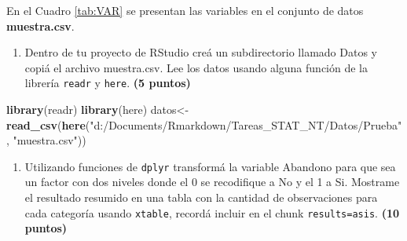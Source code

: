 \documentclass[
]{article}
\newenvironment{Shaded}{\begin{snugshade}}{\end{snugshade}}
\newcommand{\DataTypeTok}[1]{\textcolor[rgb]{0.13,0.29,0.53}{#1}}
\newcommand{\KeywordTok}[1]{\textcolor[rgb]{0.13,0.29,0.53}{\textbf{#1}}}
\newcommand{\NormalTok}[1]{#1}
\newcommand{\OperatorTok}[1]{\textcolor[rgb]{0.81,0.36,0.00}{\textbf{#1}}}
\newcommand{\StringTok}[1]{\textcolor[rgb]{0.31,0.60,0.02}{#1}}
\providecommand{\tightlist}{%
  \setlength{\itemsep}{0pt}\setlength{\parskip}{0pt}}
\begin{document}
En el Cuadro \ref{tab:VAR} se presentan las variables en el conjunto de
datos \textbf{muestra.csv}.

\newpage

\begin{enumerate}
\def\labelenumi{\arabic{enumi}.}
\tightlist
\item
  Dentro de tu proyecto de RStudio creá un subdirectorio llamado Datos y
  copiá el archivo muestra.csv. Lee los datos usando alguna función de
  la librería \texttt{readr} y \texttt{here}. \textbf{(5 puntos)}
\end{enumerate}

\begin{Shaded}
\begin{Highlighting}[]
\KeywordTok{library}\NormalTok{(readr)}
\KeywordTok{library}\NormalTok{(here)}
\NormalTok{datos<-}\KeywordTok{read_csv}\NormalTok{(}\KeywordTok{here}\NormalTok{(}\StringTok{"d:/Documents/Rmarkdown/Tareas_STAT_NT/Datos/Prueba"}\NormalTok{, }\StringTok{"muestra.csv"}\NormalTok{))}
\end{Highlighting}
\end{Shaded}

\begin{enumerate}
\def\labelenumi{\arabic{enumi}.}
\setcounter{enumi}{1}
\tightlist
\item
  Utilizando funciones de \texttt{dplyr} transformá la variable Abandono
  para que sea un factor con dos niveles donde el 0 se recodifique a No
  y el 1 a Si. Mostrame el resultado resumido en una tabla con la
  cantidad de observaciones para cada categoría usando \texttt{xtable},
  recordá incluir en el chunk
  \texttt{results=\textquotesingle{}asis\textquotesingle{}}. \textbf{(10
  puntos)}
\end{enumerate}

\begin{Shaded}
\end{Shaded}
\end{document}
